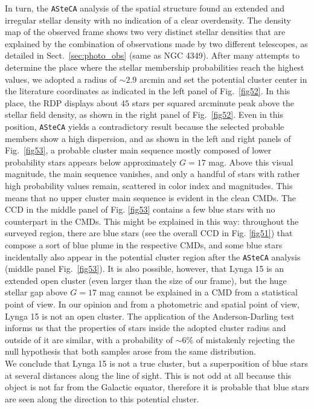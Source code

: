 \documentclass[draft]{aa}
\begin{document}
In turn, the \texttt{ASteCA} analysis of the spatial structure found an extended and
irregular stellar density with no indication of a clear overdensity.
The density map of the observed frame shows two very distinct stellar
densities that are explained by the combination of observations made by two different
telescopes, as detailed in Sect.~\ref{sec:photo_obs} (same as NGC 4349).
%
After many attempts to determine the place where the stellar membership
probabilities reach the highest values, we adopted a  radius of $\sim2.9$ arcmin and
set the potential cluster center in the literature coordinates as indicated in the left panel of
Fig.~\ref{fig52}. In this place, the RDP displays about $45$ stars
per squared arcminute peak above the stellar field density, as shown in the right
panel of Fig.~\ref{fig52}.
%
Even in this position, \texttt{ASteCA} yields a contradictory result
because the selected probable members show a high dispersion, and as
shown in the left and right panels of Fig.~\ref{fig53}, a probable cluster main
sequence mostly composed of lower probability stars appears below approximately
$G=17$ mag.
Above this visual magnitude, the main sequence vanishes, and only a handful of stars with rather high probability values remain, scattered in
color index and magnitudes. This means that no upper cluster main sequence is
evident in the clean CMDs.
%
The CCD in the middle panel of Fig. \ref{fig53} contains a few blue stars with no
counterpart in the CMDs. This might be explained in this way: throughout the
surveyed region, there are blue stars (see the overall CCD in Fig. \ref{fig51})
that compose a sort of blue plume in the respective CMDs, and some
blue stars incidentally also appear in the potential cluster region after the \texttt{ASteCA}
analysis (middle panel Fig.~\ref{fig53}). It is also possible, however, that Lynga 15
is an extended open cluster (even larger than the size of our frame), but the huge stellar gap above $G=17$ mag cannot be explained in a CMD from a
statistical point of view.
%
In our opinion and from a photometric and spatial point of view, Lynga 15 is not
an open cluster. The application of the Anderson-Darling test informs us that
the properties of stars inside the adopted cluster radius and outside of it are
similar, with a probability of $\sim$6\% of mistakenly rejecting the null
hypothesis that both samples arose from the same distribution.\\

We conclude that Lynga 15 is not a true cluster, but a superposition of blue
stars at several distances along the line of sight.
This is not odd at all because this object is not far from the Galactic equator,
therefore it is probable that blue stars are seen along the direction to this
potential cluster.
\end{document}

